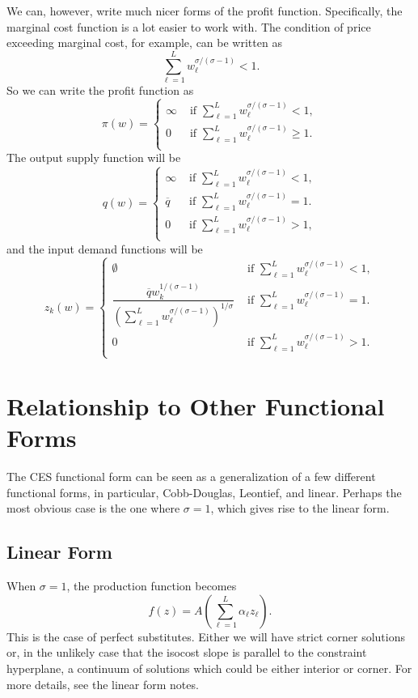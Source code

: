 \documentclass[12pt]{article}
\theoremstyle{definition}
\begin{document}
We can, however, write much nicer forms of the profit function. Specifically, the marginal cost function is a lot easier to work with. The condition of price exceeding marginal cost, for example, can be written as 
	\[
		 \sum_{\ell=1}^L   w_{\ell} ^{\sigma / (\sigma - 1)} < 1.
	\]
So we can write the profit function as 
\[
\pi(w) = 
\begin{cases}
	\infty 	& 	\text{ if } \sum_{\ell=1}^L   w_{\ell} ^{\sigma / (\sigma - 1)} < 1,\\
	0 	& 	\text{ if } \sum_{\ell=1}^L   w_{\ell} ^{\sigma / (\sigma - 1)} \geq 1.\\
\end{cases}
\]
The output supply function will be
\[
q(w) = 
\begin{cases}
	\infty	& 	\text{ if } \sum_{\ell=1}^L   w_{\ell} ^{\sigma / (\sigma - 1)} < 1,\\
	\overline{q}	& 	\text{ if } \sum_{\ell=1}^L   w_{\ell} ^{\sigma / (\sigma - 1)} = 1.\\
	0 	& 	\text{ if } \sum_{\ell=1}^L   w_{\ell} ^{\sigma / (\sigma - 1)} > 1,\\
\end{cases}
\]
and the input demand functions will be
\[
z_k(w) = 
\begin{cases}
	\emptyset	& 	\text{ if } \sum_{\ell=1}^L   w_{\ell} ^{\sigma / (\sigma - 1)} < 1,\\
	\dfrac{\overline{q} w_k^{1 / (\sigma - 1)} }{\left( \sum_{\ell=1}^L  w_{\ell}^{\sigma / (\sigma - 1)} \right) ^{1 / \sigma}}	& 	\text{ if } \sum_{\ell=1}^L   w_{\ell} ^{\sigma / (\sigma - 1)} = 1.\\
	0 	& 	\text{ if } \sum_{\ell=1}^L   w_{\ell} ^{\sigma / (\sigma - 1)} > 1.\\
\end{cases}
\]


\section{Relationship to Other Functional Forms}	
The CES functional form can be seen as a generalization of a few different functional forms, in particular, Cobb-Douglas, Leontief, and linear. Perhaps the most obvious case is the one where $\sigma=1$, which gives rise to the linear form. 

\subsection{Linear Form}
When $\sigma=1$, the production function becomes
	\[	f(z)=A \left(\sum_{\ell = 1}^L \alpha_{\ell} z_{\ell} \right).\]
This is the case of perfect substitutes. Either we will have strict corner solutions or, in the unlikely case that the isocost slope is parallel to the constraint hyperplane, a continuum of solutions which could be either interior or corner. For more details, see the linear form notes. 
\end{document}
